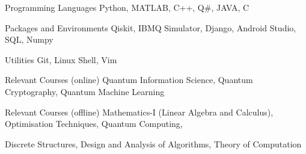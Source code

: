 

\begin{cvskills}

  \cvskill
    {Programming Languages} %
    {Python, MATLAB, C++, Q#, JAVA, C} %

  \cvskill
    {Packages and Environments} %
    {Qiskit, IBMQ Simulator, Django, Android Studio, SQL, Numpy} %
    

  \cvskill
    {Utilities} %
    {Git, Linux Shell, Vim} %


  \cvskill
    {Relevant Courses (online)} %
    {Quantum Information Science, Quantum Cryptography, Quantum Machine Learning} %

    
  \cvskill
    {Relevant Courses (offline)}
    {Mathematics-I (Linear Algebra and Calculus), Optimisation Techniques, Quantum Computing, } 
    
  \cvskill
  {}
  {Discrete Structures, Design and Analysis of Algorithms, Theory of Computation}
\end{cvskills}
